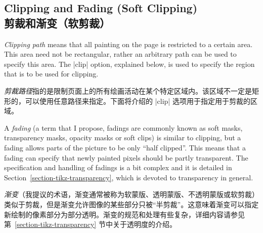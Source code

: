 \subsection{Clipping and Fading (Soft Clipping)\\剪裁和渐变（软剪裁）}

\emph{Clipping path} means that all painting on the page is restricted to a
certain area. This area need not be rectangular, rather an arbitrary path can
be used to specify this area. The |clip| option, explained below, is used to
specify the region that is to be used for clipping.

\emph{剪裁路径}指的是限制页面上的所有绘画活动在某个特定区域内。该区域不一定是矩形的，可以使用任意路径来指定。下面将介绍的 |clip| 选项用于指定用于剪裁的区域。

A \emph{fading} (a term that I propose, fadings are commonly known as soft
masks, transparency masks, opacity masks or soft clips) is similar to clipping,
but a fading allows parts of the picture to be only ``half clipped''. This
means that a fading can specify that newly painted pixels should be partly
transparent. The specification and handling of fadings is a bit complex and it
is detailed in Section~\ref{section-tikz-transparency}, which is devoted to
transparency in general.

\emph{渐变}（我提议的术语，渐变通常被称为软蒙版、透明蒙版、不透明蒙版或软剪裁）类似于剪裁，但是渐变允许图像的某些部分只被“半剪裁”。这意味着渐变可以指定新绘制的像素部分为部分透明。渐变的规范和处理有些复杂，详细内容请参见第~\ref{section-tikz-transparency} 节中关于透明度的介绍。

